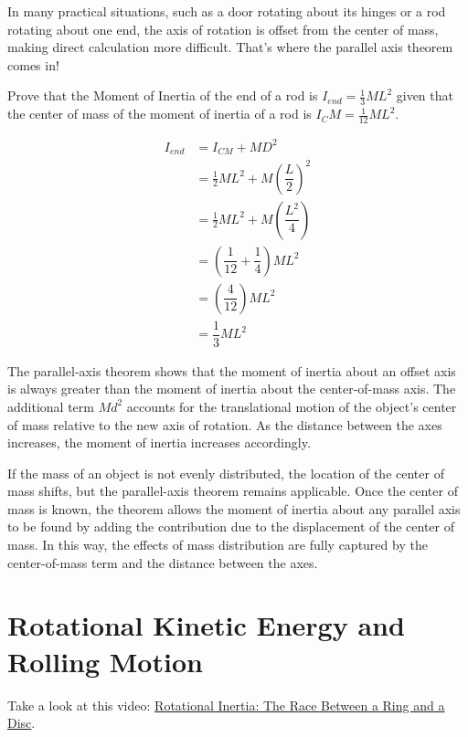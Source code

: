 In many practical situations, such as a door rotating about its hinges or a rod rotating about one end, the axis of rotation is offset from the center of mass, making direct calculation more difficult. That's where the parallel axis theorem comes in!

\begin{Exercise}[title=Parallel Axis Theorem, label=parallelAxisThm1]
Prove that the Moment of Inertia of the end of a rod is $I_{end} = \frac{1}{3}ML^2$ given that the center of mass of the moment of inertia of a rod is $I_CM = \frac{1}{12}ML^2$.
\end{Exercise}
\begin{Answer}[ref=parallelAxisThm1]
\begin{align*}
  I_{end} &= I_{CM} + MD^2 \\
          &= \frac{1}{2}ML^2 + M\left( \dfrac{L}{2} \right)^2\\
          &= \frac{1}{2}ML^2 + M\left( \dfrac{L^2}{4} \right) \\ 
          &= \left(  \dfrac{1}{12} + \dfrac{1}{4}  \right)ML^2 \\
          &= \left(  \dfrac{4}{12}  \right) ML^2\\
          &= \dfrac{1}{3} ML^2
\end{align*}
\end{Answer}

The parallel-axis theorem shows that the moment of inertia about an offset axis is always greater than the moment of inertia about the center-of-mass axis. The additional term $Md^2$ accounts for the translational motion of the object's center of mass relative to the new axis of rotation. As the distance between the axes increases, the moment of inertia increases accordingly.

If the mass of an object is not evenly distributed, the location of the center of mass shifts, but the parallel-axis theorem remains applicable. Once the center of mass is known, the theorem allows the moment of inertia about any parallel axis to be found by adding the contribution due to the displacement of the center of mass. In this way, the effects of mass distribution are fully captured by the center-of-mass term and the distance between the axes.


\section{Rotational Kinetic Energy and Rolling Motion}
Take a look at this video: \href{https://www.youtube.com/watch?v=CHQOctEvtTY}{Rotational Inertia: The Race Between a Ring and a Disc}.

